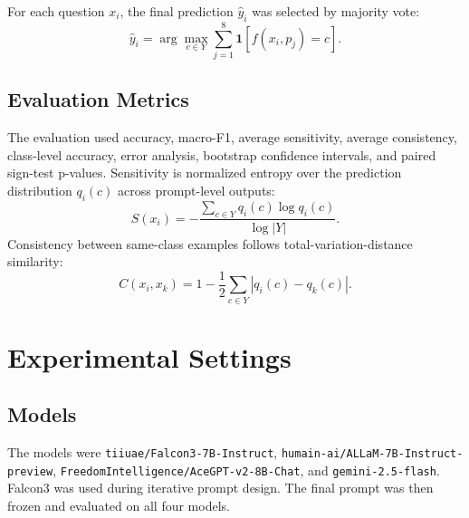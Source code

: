 \documentclass[10pt,twocolumn]{article}
\begin{document}
For each question $x_i$, the final prediction $\hat{y}_i$ was selected by majority vote:
\begin{equation}
\hat{y}_i = \arg\max_{c \in Y} \sum_{j=1}^{8} \mathbf{1}[f(x_i,p_j)=c].
\end{equation}
\subsection{Evaluation Metrics}
The evaluation used accuracy, macro-F1, average sensitivity, average consistency, class-level accuracy, error analysis, bootstrap confidence intervals, and paired sign-test p-values. Sensitivity is normalized entropy over the prediction distribution $q_i(c)$ across prompt-level outputs:
\begin{equation}
S(x_i)=-\frac{\sum_{c\in Y}q_i(c)\log q_i(c)}{\log |Y|}.
\end{equation}
Consistency between same-class examples follows total-variation-distance similarity:
\begin{equation}
C(x_i,x_k)=1-\frac{1}{2}\sum_{c\in Y}|q_i(c)-q_k(c)|.
\end{equation}
\section{Experimental Settings}
\subsection{Models}
The models were \texttt{tiiuae/Falcon3-7B-Instruct}, \texttt{humain-ai/ALLaM-7B-Instruct-preview}, \texttt{FreedomIntelligence/AceGPT-v2-8B-Chat}, and \texttt{gemini-2.5-flash}. Falcon3 was used during iterative prompt design. The final prompt was then frozen and evaluated on all four models.
\end{document}

